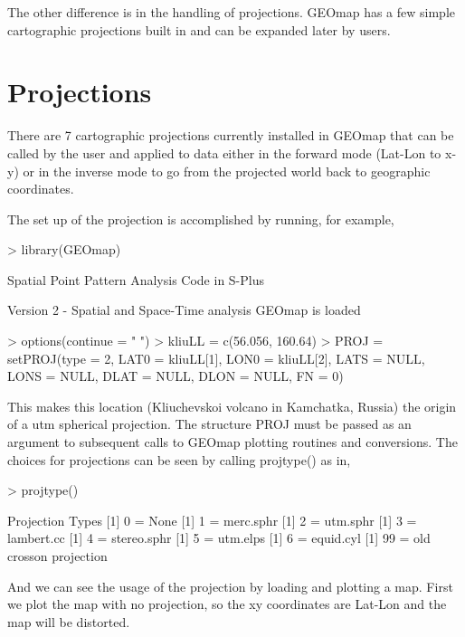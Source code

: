 \documentclass{article}
\begin{document}
The other difference is in the handling of projections.  GEOmap
has a few simple cartographic projections built in 
and can be expanded later by users.


\section{Projections}

There are  7 cartographic projections currently installed in 
GEOmap that can be called by the user and applied to data
either in the forward mode (Lat-Lon to x-y) or in the inverse
mode to go from the projected world back to geographic coordinates.

The set up of the projection is accomplished by 
running, for example,

\begin{Schunk}
\begin{Sinput}
> library(GEOmap)
\end{Sinput}
Spatial Point Pattern Analysis Code in S-Plus

 Version 2 - Spatial and Space-Time analysis
GEOmap is loaded\begin{Sinput}
> options(continue = " ")
> kliuLL = c(56.056, 160.64)
> PROJ = setPROJ(type = 2, LAT0 = kliuLL[1], LON0 = kliuLL[2], 
     LATS = NULL, LONS = NULL, DLAT = NULL, DLON = NULL, FN = 0)
\end{Sinput}
\end{Schunk}

This makes this location (Kliuchevskoi volcano in Kamchatka, Russia) the origin 
of a utm spherical projection.
The structure PROJ must be passed as an argument to subsequent 
calls to GEOmap plotting routines and conversions.
The choices for projections can be seen by calling  projtype()
as in,
\begin{Schunk}
\begin{Sinput}
> projtype()
\end{Sinput}
\begin{Soutput}
[1] Projection Types
[1] 0 = None
[1] 1 = merc.sphr
[1] 2 = utm.sphr
[1] 3 = lambert.cc
[1] 4 = stereo.sphr
[1] 5 = utm.elps
[1] 6 = equid.cyl
[1] 99 = old crosson projection
\end{Soutput}
\end{Schunk}

And we can see the usage of the projection by loading and plotting a map.
First we plot the map with no projection, so the xy coordinates are Lat-Lon
and the map will be distorted.
\end{document}
